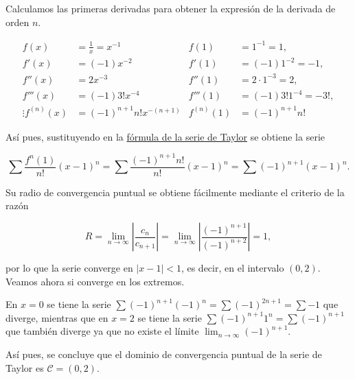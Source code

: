 \documentclass[
  spanish,
  a4paper,
]{scrreport}
\theoremstyle{definition}
\theoremstyle{remark}
\begin{document}
\begin{tcolorbox}[enhanced jigsaw, arc=.35mm, bottomrule=.15mm, bottomtitle=1mm, breakable, colback=white, colbacktitle=quarto-callout-tip-color!10!white, colframe=quarto-callout-tip-color-frame, coltitle=black, left=2mm, leftrule=.75mm, opacityback=0, opacitybacktitle=0.6, rightrule=.15mm, title=\textcolor{quarto-callout-tip-color}{\faLightbulb}\hspace{0.5em}{Solución}, titlerule=0mm, toprule=.15mm, toptitle=1mm]

Calculamos las primeras derivadas para obtener la expresión de la
derivada de orden \(n\).

\begin{align*}
f(x) &= \frac{1}{x} = x^{-1} & f(1) &= 1^{-1} = 1,\\
f'(x) &= (-1)x^{-2} & f'(1) &= (-1)1^{-2} = -1,\\
f''(x) &= 2x^{-3} & f''(1) &= 2\cdot 1^{-3} = 2,\\
f'''(x) &= (-1)3!x^{-4} & f'''(1) &= (-1)3! 1^{-4} = -3!,\\
\vdots
f^{(n)}(x) &= (-1)^{n+1}n!x^{-(n+1)} & f^{(n)}(1) &= (-1)^{n+1}n!
\end{align*}

Así pues, sustituyendo en la
\href{https://aprendeconalf.es/analisis-manual/08-series.html\#def-serie-taylor}{fórmula
de la serie de Taylor} se obtiene la serie

\[
\sum \frac{f^{n}(1)}{n!}(x-1)^n = \sum \frac{(-1)^{n+1}n!}{n!}(x-1)^n = \sum (-1)^{n+1}(x-1)^n.
\]

Su radio de convergencia puntual se obtiene fácilmente mediante el
criterio de la razón

\[
R = \lim_{n\to\infty} \left|\frac{c_n}{c_{n+1}}\right| = \lim_{n\to\infty} \left|\frac{(-1)^{n+1}}{(-1)^{n+2}}\right| = 1,
\]

por lo que la serie converge en \(|x-1|<1\), es decir, en el intervalo
\((0,2)\). Veamos ahora si converge en los extremos.

En \(x=0\) se tiene la serie
\(\sum (-1)^{n+1}(-1)^n = \sum (-1)^{2n+1} = \sum -1\) que diverge,
mientras que en \(x=2\) se tiene la serie
\(\sum (-1)^{n+1}1^n = \sum (-1)^{n+1}\) que también diverge ya que no
existe el límite \(\lim_{n\to\infty} (-1)^{n+1}\).

Así pues, se concluye que el dominio de convergencia puntual de la serie
de Taylor es \(\mathcal{C}=(0,2)\).

\end{tcolorbox}
\end{document}
